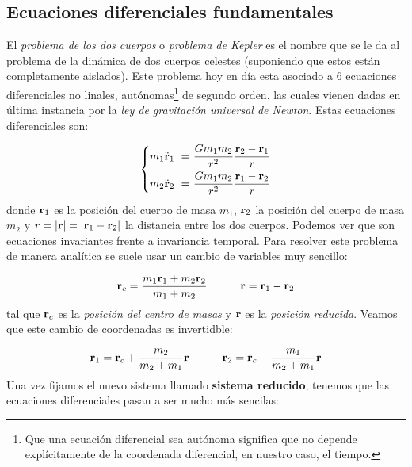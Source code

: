 \subsection{Ecuaciones diferenciales fundamentales}

El \textit{problema de los dos cuerpos} o \textit{problema de Kepler} es el nombre que se le da al problema de la dinámica de dos cuerpos celestes (suponiendo que estos están completamente aislados). Este problema hoy en día esta asociado a 6 ecuaciones diferenciales no linales, autónomas\footnote{Que una ecuación diferencial sea autónoma significa que no depende explícitamente de la coordenada diferencial, en nuestro caso, el tiempo.} de segundo orden, las cuales vienen dadas en última instancia por la \textit{ley de gravitación universal de Newton}. Estas ecuaciones diferenciales son:

\begin{equation}
	\left\lbrace
	\begin{split}
		m_1 \ddot{\mathbf{r}}_1 \ = \  & \frac{Gm_1m_2}{r^2} \frac{\mathbf{r}_2-\mathbf{r}_1}{r} \\
		m_2 \ddot{\mathbf{r}}_2 \ = \  & \frac{Gm_1m_2}{r^2} \frac{\mathbf{r}_1-\mathbf{r}_2}{r}
	\end{split} \right.
\end{equation}
donde $\mathbf{r}_1$ es la posición del cuerpo de masa $m_1$, $\mathbf{r}_2$ la posición del cuerpo de masa $m_2$ y $r=|\mathbf{r}|=|\mathbf{r}_1-\mathbf{r}_2|$ la distancia entre los dos cuerpos. Podemos ver que son ecuaciones invariantes frente a invariancia temporal. Para resolver este problema de manera analítica se suele usar un cambio de variables muy sencillo:

\begin{equation}
	\mathbf{r}_c = \frac{m_1\mathbf{r}_1+m_2\mathbf{r}_2}{m_1+m_2} \quad \quad \quad \mathbf{r}=\mathbf{r}_1-\mathbf{r}_2
\end{equation}
tal que $\mathbf{r}_c$ es la \textit{posición del centro de masas} y $\mathbf{r}$ es la \textit{posición reducida}. Veamos que este cambio de coordenadas es invertidble:

\begin{equation}
	\mathbf{r}_1 = \mathbf{r}_c + \frac{m_2}{m_2+m_1} \mathbf{r}  \quad \quad \quad \mathbf{r}_2 = \mathbf{r}_c - \frac{m_1}{m_2+m_1} \mathbf{r}
\end{equation}
Una vez fijamos el nuevo sistema llamado \textbf{sistema reducido}, tenemos que las ecuaciones diferenciales pasan a ser mucho más sencilas:

